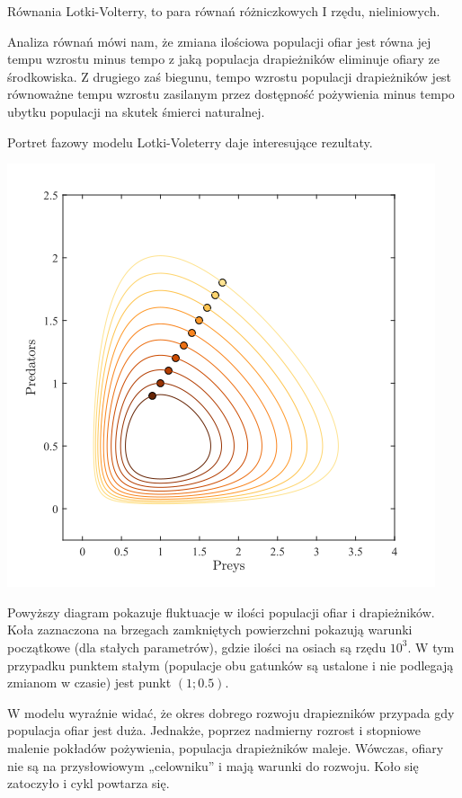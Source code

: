 \noindent Równania Lotki-Volterry, to para równań różniczkowych I rzędu, nieliniowych.

\noindent Analiza równań mówi nam, że zmiana ilościowa populacji ofiar jest równa jej tempu wzrostu minus  tempo z jaką populacja drapieżników eliminuje ofiary ze środkowiska. Z drugiego zaś biegunu, tempo wzrostu populacji drapieżników jest równoważne tempu wzrostu zasilanym przez dostępność pożywienia minus tempo ubytku populacji na skutek śmierci naturalnej.

\noindent Portret fazowy modelu Lotki-Voleterry daje interesujące rezultaty.

\includegraphics{img/symu}

\noindent Powyższy diagram pokazuje fluktuacje w ilości populacji ofiar i drapieżników. Koła zaznaczona na brzegach zamkniętych powierzchni pokazują warunki początkowe (dla stałych parametrów), gdzie ilości na osiach są rzędu $10^3$. W tym przypadku punktem stałym (populacje obu gatunków są ustalone i nie podlegają zmianom w czasie) jest punkt $(1;0.5)$. 

\noindent W modelu wyraźnie widać, że okres dobrego rozwoju drapiezników przypada gdy populacja ofiar jest duża. Jednakże, poprzez nadmierny rozrost i stopniowe malenie pokładów pożywienia, populacja drapieżników maleje. Wówczas, ofiary nie są na przysłowiowym „celowniku” i mają warunki do rozwoju. Koło się zatoczyło i cykl powtarza się.

